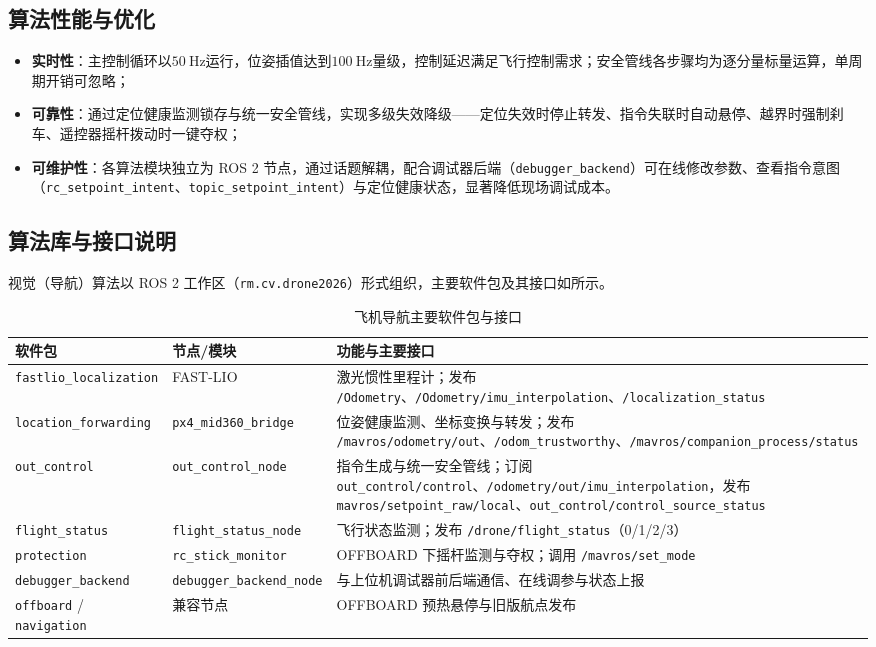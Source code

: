 \subsection{算法性能与优化}
\begin{itemize}
    \item \textbf{实时性}：主控制循环以$\qty{50}{\Hz}$运行，位姿插值达到$\qty{100}{\Hz}$量级，控制延迟满足飞行控制需求；安全管线各步骤均为逐分量标量运算，单周期开销可忽略；
    \item \textbf{可靠性}：通过定位健康监测锁存与统一安全管线，实现多级失效降级——定位失效时停止转发、指令失联时自动悬停、越界时强制刹车、遥控器摇杆拨动时一键夺权；
    \item \textbf{可维护性}：各算法模块独立为 ROS 2 节点，通过话题解耦，配合调试器后端（\lstinline{debugger_backend}）可在线修改参数、查看指令意图（\lstinline{rc_setpoint_intent}、\lstinline{topic_setpoint_intent}）与定位健康状态，显著降低现场调试成本。
\end{itemize}

\subsection{算法库与接口说明}
视觉（导航）算法以 ROS 2 工作区（\lstinline{rm.cv.drone2026}）形式组织，主要软件包及其接口如所示。

\begin{table}[hbt!]
\centering
\begin{tabular}{m{4.5cm}<{\centering}m{5cm}<{\centering}m{6cm}<{\centering}}
    \hline
    软件包 & 节点/模块 & 功能与主要接口 \\
    \hline
    \texttt{fastlio\_localization} & FAST-LIO & 激光惯性里程计；发布 \texttt{/Odometry}、\texttt{/Odometry/imu\_interpolation}、\texttt{/localization\_status} \\
    \texttt{location\_forwarding} & \texttt{px4\_mid360\_bridge} & 位姿健康监测、坐标变换与转发；发布 \texttt{/mavros/odometry/out}、\texttt{/odom\_trustworthy}、\texttt{/mavros/companion\_process/status} \\
    \texttt{out\_control} & \texttt{out\_control\_node} & 指令生成与统一安全管线；订阅 \texttt{out\_control/control}、\texttt{/odometry/out/imu\_interpolation}，发布 \texttt{mavros/setpoint\_raw/local}、\texttt{out\_control/control\_source\_status} \\
    \texttt{flight\_status} & \texttt{flight\_status\_node} & 飞行状态监测；发布 \texttt{/drone/flight\_status}（0/1/2/3） \\
    \texttt{protection} & \texttt{rc\_stick\_monitor} & OFFBOARD 下摇杆监测与夺权；调用 \texttt{/mavros/set\_mode} \\
    \texttt{debugger\_backend} & \texttt{debugger\_backend\_node} & 与上位机调试器前后端通信、在线调参与状态上报 \\
    \texttt{offboard} / \texttt{navigation} & 兼容节点 & OFFBOARD 预热悬停与旧版航点发布 \\
    \hline
\end{tabular}
\caption{飞机导航主要软件包与接口}
\label{tab:飞机导航软件包}
\end{table}

\newpage
